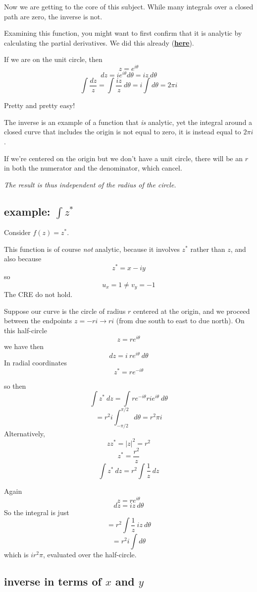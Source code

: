 \documentclass[11pt, oneside]{article}
\begin{document}
Now we are getting to the core of this subject.  While many integrals over a closed path are zero, the inverse is not.

Examining this function, you might want to first confirm that it is analytic by calculating the partial derivatives.  We did this already (\hyperref[sec:CRE_inverse]{\textbf{here}}).

If we are on the unit circle, then 
\[ z = e^{i\theta} \]
\[ dz = ie^{i\theta} d \theta = iz\ d \theta \]
\[ \int \frac{dz}{z} = \int \frac{iz}{z} \ d \theta = i \int d \theta = 2 \pi i \]

Pretty and pretty easy!

The inverse is an example of a function that \emph{is} analytic, yet the integral around a closed curve that includes the origin is not equal to zero, it is instead equal to $2 \pi i$.  

If we're centered on the origin but we don't have a unit circle, there will be an $r$ in both the numerator and the denominator, which cancel.

\emph{The result is thus independent of the radius of the circle.}

\subsection*{example:  $\int z^*$}
Consider $f(z) = z^*$.

This function is of course \emph{not} analytic, because it involves $z^*$ rather than $z$, and also because
\[ z^* = x - iy \]
so
\[ u_x = 1 \ne v_y = - 1 \]
The CRE do not hold.

Suppose our curve is the circle of radius $r$ centered at the origin, and we proceed between the endpoints $z = -ri \rightarrow ri$ (from due south to east to due north).  On this half-circle 
\[ z = re^{i \theta} \]
we have then
\[ dz = i \ re^{i \theta} \ d \theta \]
In radial coordinates
\[ z^* = re^{-i\theta} \]

so then
\[ \int {z^*} \ dz = \int r e^{-i\theta} r i e^{i \theta} \ d \theta \]
\[ = r^2 i \int_{-\pi/2}^{\pi/2} d \theta = r^2 \pi i \]
Alternatively,
\[ zz^* = |z|^2 = r^2  \]
\[ z^* = \frac{r^2}{z} \]
\[ \int {z^*} \ dz = r^2 \int \frac{1}{z} \ dz \]

Again
\[ z = re^{i \theta} \]
\[ dz = iz \ d \theta \]
So the integral is just
\[ = r^2 \int \frac{1}{z} \ iz \ d \theta   \]
\[ = r^2 i \int d \theta \]
which is $ir^2 \pi$, evaluated over the half-circle.

\subsection*{inverse in terms of $x$ and $y$}
\end{document}
